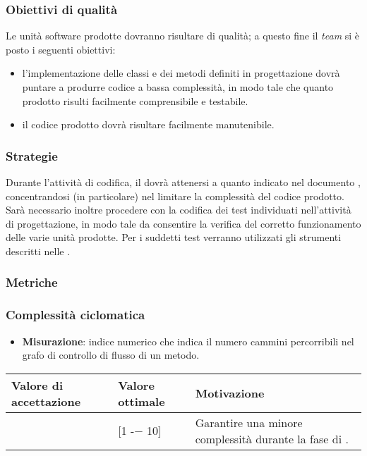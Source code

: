 \subsubsection{Obiettivi di qualità}
Le unità software prodotte dovranno risultare di qualità; a questo fine il \textit{team} si è posto i seguenti obiettivi:
\begin{itemize}
\item l'implementazione delle classi e dei metodi definiti in progettazione dovrà puntare a produrre codice a bassa complessità, in modo tale che quanto prodotto risulti facilmente comprensibile e testabile.
\item il codice prodotto dovrà risultare facilmente manutenibile.
\end{itemize}
\subsubsection{Strategie}
Durante l'attività di codifica, il \textit{\Progr} dovrà attenersi a quanto indicato nel documento \textit{\DDP}, concentrandosi (in particolare) nel limitare la complessità del codice prodotto. Sarà necessario inoltre procedere con la codifica dei test individuati nell'attività di progettazione, in modo tale da consentire la verifica del corretto funzionamento delle varie unità prodotte. Per i suddetti test verranno utilizzati gli strumenti descritti nelle \NdP.
\subsubsection{Metriche}

\subsubsection{Complessità ciclomatica}

\begin{itemize}
\item \textbf{Misurazione}: indice numerico che indica il numero cammini percorribili nel grafo di controllo di flusso di un metodo.
\end{itemize}

\begin{center}
		\begin{tabular}{|P{2.5cm}|P{2.5cm}|P{6cm}|}
		\hline
			\textbf{Valore di accettazione}	& \textbf{Valore ottimale} & \textbf{Motivazione} \\
			\hline
			[1 -− 15] & [1 -− 10] &	Garantire una minore complessità durante la fase di \COD. \\
			\hline
			\end{tabular}
\end{center}


